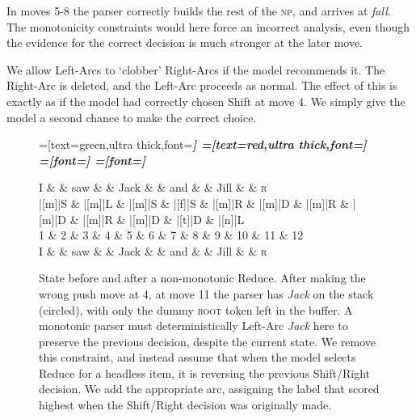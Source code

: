 \documentclass[11pt,letterpaper]{article}
\begin{document}
In moves 5-8 the parser correctly builds the rest of the \textsc{np}, and arrives
at \emph{fall}. The monotonicity constraints would here force an incorrect analysis,
even though the evidence for the correct decision is much stronger at the later move.

We allow Left-Arcs to `clobber' Right-Arcs if the model
recommends it. The Right-Arc is deleted, and the Left-Arc proceeds as normal. The
effect of this is exactly as if the model had correctly chosen Shift at
move 4. We simply give the model a second chance to make the correct choice.

\begin{figure}
    \centering
    \begin{dependency}[theme=simple]
    =[text=green,ultra thick,font=\bfseries\itshape]
    =[text=red,ultra thick,font=\bfseries\itshape]
    =[font=\bfseries\itshape]
    =[font=\itshape]
    \begin{deptext}[column sep=.075cm, row sep=.1ex]
        I \&           \& saw \&          \& Jack       \& \& and     \&           \& Jill \&   \& \textsc{r} \\
       |[m]|S \& |[m]|L \& |[m]|S   \& |[f]|S \& |[m]|R \& |[m]|D \& |[m]|R \& |[m]|D \& |[m]|R \& |[m]|D \& |[t]|D \& |[n]|L \\
            1 \&     2       \& 3  \&   4      \& 5          \& 6 \& 7     \& 8 \& 9 \& 10 \& 11 \& 12 \\
            I \&           \& saw \&          \& Jack       \& \& and     \&           \& Jill \& \& \textsc{r} \\
\end{deptext}
    
    
\end{dependency}
\caption{
\small
State before and after a non-monotonic Reduce.
After making the wrong push move at 4, at move 11
the parser has \emph{Jack} on the stack (circled), with only the dummy \textsc{root}
token left in the buffer. A monotonic parser must deterministically Left-Arc
\emph{Jack} here to preserve the previous decision, despite the current state.
We remove this constraint, and instead assume that when the model selects Reduce
for a headless item, it is reversing the previous Shift/Right decision. We add
the appropriate arc, assigning the label that scored highest when the Shift/Right
decision was originally made.
\label{fig:adduce}}
\end{figure}
\end{document}
